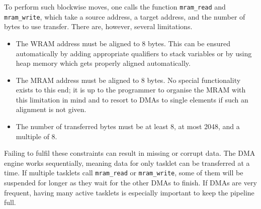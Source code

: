 To perform such blockwise moves, one calls the \langC{} function \lstinline|mram_read| and \lstinline|mram_write|, which take a source address, a target address, and the number of bytes to use transfer.
There are, however, several limitations.
\begin{itemize}
	\item
	The \ac{WRAM} address must be aligned to 8 bytes.
	This can be ensured automatically by adding appropriate qualifiers to stack variables or by using heap memory which gets properly aligned automatically.

	\item
	The \ac{MRAM} address must be aligned to 8 bytes.
	No special functionality exists to this end;
	it is up to the programmer to organise the \ac{MRAM} with this limitation in mind and to resort to \acp{DMA} to single elements if such an alignment is not given.

	\item
	The number of transferred bytes must be at least 8, at most 2048, and a multiple of 8.
\end{itemize}
Failing to fulfil these constraints can result in missing or corrupt data.
The \ac{DMA} engine works sequentially, meaning data for only tasklet can be transferred at a time.
If multiple tasklets call \lstinline|mram_read| or \lstinline|mram_write|, some of them will be suspended for longer as they wait for the other \acp{DMA} to finish.
If \acp{DMA} are very frequent, having many active tasklets is especially important to keep the pipeline full.

